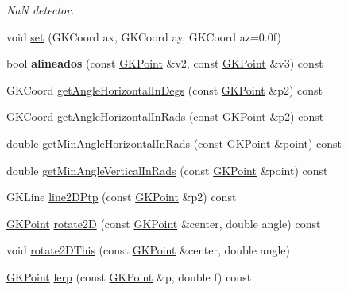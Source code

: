 \begin{DoxyCompactItemize}
\begin{DoxyCompactList}\small\item\em NaN detector. \end{DoxyCompactList}\item 
void \hyperlink{classGKPoint_a8d225379f5fc0faed23c5f171fcad9d4}{set} (G\+K\+Coord ax, G\+K\+Coord ay, G\+K\+Coord az=0.\+0f)
\item 
bool {\bfseries alineados} (const \hyperlink{classGKPoint}{G\+K\+Point} \&v2, const \hyperlink{classGKPoint}{G\+K\+Point} \&v3) const \hypertarget{classGKPoint_acb6d96959b54e4bb0d8c4ef2248607f4}{}\label{classGKPoint_acb6d96959b54e4bb0d8c4ef2248607f4}

\item 
G\+K\+Coord \hyperlink{classGKPoint_acbb8052799fc88956c88bfde3d3d4ba6}{get\+Angle\+Horizontal\+In\+Degs} (const \hyperlink{classGKPoint}{G\+K\+Point} \&p2) const 
\item 
G\+K\+Coord \hyperlink{classGKPoint_a78fd6383b37a6047891652af89be807d}{get\+Angle\+Horizontal\+In\+Rads} (const \hyperlink{classGKPoint}{G\+K\+Point} \&p2) const 
\item 
double \hyperlink{classGKPoint_a6c1727e81b0cd7a70193d1d1f58d7242}{get\+Min\+Angle\+Horizontal\+In\+Rads} (const \hyperlink{classGKPoint}{G\+K\+Point} \&point) const 
\item 
double \hyperlink{classGKPoint_a325037c771bdbbd40db82ea7e6f0f617}{get\+Min\+Angle\+Vertical\+In\+Rads} (const \hyperlink{classGKPoint}{G\+K\+Point} \&point) const 
\item 
G\+K\+Line \hyperlink{classGKPoint_a80f59e2ee0485cb00e926e06b3dadb01}{line2\+D\+Ptp} (const \hyperlink{classGKPoint}{G\+K\+Point} \&p2) const 
\item 
\hyperlink{classGKPoint}{G\+K\+Point} \hyperlink{classGKPoint_a73b34991d203aff80955bac7f7a8ce99}{rotate2D} (const \hyperlink{classGKPoint}{G\+K\+Point} \&center, double angle) const 
\item 
void \hyperlink{classGKPoint_a0c2d013b0a50fd9f5aa9a78637adf07e}{rotate2\+D\+This} (const \hyperlink{classGKPoint}{G\+K\+Point} \&center, double angle)
\item 
\hyperlink{classGKPoint}{G\+K\+Point} \hyperlink{classGKPoint_abc1d081da24f07b08ce9eccbfb0f54b8}{lerp} (const \hyperlink{classGKPoint}{G\+K\+Point} \&p, double f) const \hypertarget{classGKPoint_abc1d081da24f07b08ce9eccbfb0f54b8}{}\label{classGKPoint_abc1d081da24f07b08ce9eccbfb0f54b8}


\end{DoxyCompactItemize}
